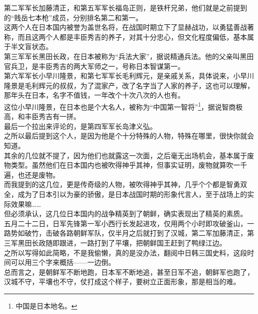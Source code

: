 \begin{multicols}{\theparacolNo}
第二军军长加藤清正，和第五军军长福岛正则，是铁杆兄弟，他们就是之前提到的“贱岳七本枪”成员，分别排名第二和第一。\\

这两个人在日本国内被誉为盖世名将，在战国时期立下了显赫战功，以勇猛善战著称，而且这两个人都是丰臣秀吉的养子，对其十分忠心，但文化程度偏低，基本属于半文盲状态。\\

第三军军长黑田长政，在日本被称为“兵法大家”，据说精通兵法。他的父亲叫黑田官兵卫，是丰臣秀吉的两大军师之一，号称日本智谋第一。\\

第六军军长小早川隆景，和第七军军长毛利辉元，是亲戚关系，具体说来，小早川隆景是毛利辉元的叔叔，为了混家产，改了名字当了人家的养子，这也可以理解，那年头在日本，名字不值钱，一年改个十次八次的人也有。\\

这位小早川隆景，在日本也是个大名人，被称为“中国第一智将”\footnote{中国是日本地名。}，据说智商极高，和丰臣秀吉有一拼。\\

最后一个拉出来评论的，是第四军军长岛津义弘。\\

之所以最后提到这个人，是因为他是个十分特殊的人物，特殊在哪里，很快你就会知道。\\

其余的几位就不提了，因为他们也就露这一次面，之后毫无出场机会，基本属于废物类型。虽然他们在日本国内也被吹得神乎其神，但事实证明，废物就算吹一千遍，也还是废物。\\

而我提到的这几位，更是传奇级的人物，被吹得神乎其神，几乎个个都是智勇双全，成为了日本引以为豪的骄傲，是日本战国时期的形象代言人，至于战场上的实际效果嘛……\\

但必须承认，这几位日本国内的战争精英到了朝鲜，确实表现出了精英的素质。\\

五月二十二日，日军先锋第一军小西行长发起进攻，仅用两个小时即攻破釜山，一路势如破竹，击破各路朝鲜军队，仅半月之后就打到了汉城，第二军加藤清正，第三军黑田长政随即跟进，一路打到了平壤，把朝鲜国王赶到了鸭绿江边。\\

之所以写得如此简略，不是我偷懒，真的是没办法，翻阅中日韩三国史料，这段时间可以用三个字来概括——一边倒。\\

总而言之，是朝鲜军不断地跑，日本军不断地追，甚至日军不追，朝鲜军也跑了，汉城不守，平壤也不守，仗打成这个样子，要树立正面形象，那是相当的难。\\


\end{multicols}

